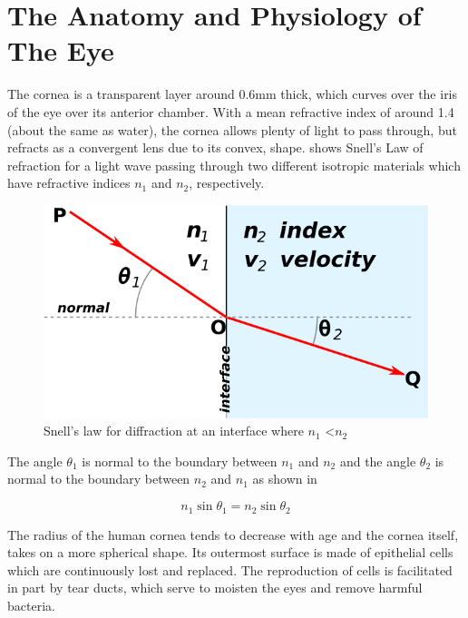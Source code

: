 
\chapter{The Anatomy and Physiology of The Eye}

\label{anatomy}

The cornea is a transparent layer around 0.6mm thick, which curves over
the iris of the eye over its anterior chamber.
\cite{yaylali1997corneal,thoft1983x,patel1994refractive}
With a mean refractive index of around 1.4 (about the same as water),
the cornea allows plenty of light to pass through, but refracts as a
convergent lens due to its convex, shape.  shows
Snell's Law of refraction for a light wave passing through two different
isotropic materials which have refractive indices $n_1$
and $n_2$, respectively.

\begin{figure}[htbp]
  \centering
    \includegraphics{figures/snells}
  \caption{Snell's law for diffraction at an interface where $n_1$ \textless $n_2$}
  \label{fig:snell}
\end{figure}

The angle $\theta_1$ is normal to the boundary between $n_1$ and $n_2$
and the angle $\theta_2$ is normal to the boundary between $n_2$ and $n_1$
as shown in 

\begin{equation}
n_1\sin\theta_1=n_2\sin\theta_2
\label{eq:refractive}
\end{equation}

The radius of the human cornea tends to decrease with age and the cornea
itself, takes on a more spherical shape.\cite{guirao2000optical} Its
outermost surface is made of epithelial cells which are continuously lost
and replaced.\cite{jester1999cellular,hassell2010molecular} The reproduction
of cells is facilitated in part by tear ducts, which  serve to moisten the
eyes and remove harmful bacteria.\cite{holly1977tear}


